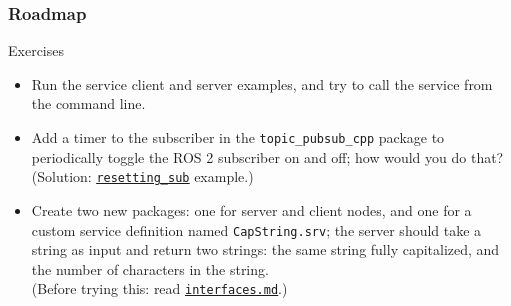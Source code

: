\documentclass[aspectratio=169]{beamer}
\begin{document}
\frame{\titlepage}



\begin{frame}
	\frametitle{Roadmap}
	\tableofcontents
\end{frame}







\begin{frame}{Exercises}
  \justifying
	\begin{itemize}
    \item Run the service client and server examples, and try to call the service from the command line.
		\item Add a timer to the subscriber in the \texttt{topic\_pubsub\_cpp} package to periodically toggle the ROS 2 subscriber on and off; how would you do that?\\
		      (Solution: \href{https://github.com/IntelligentSystemsLabUTV/ros2-examples/blob/jazzy/src/cpp/topic_pubsub_cpp/src/resetting_sub.cpp}{\color{blue}\underline{\texttt{resetting\_sub}}} example.)
		\item Create two new packages: one for server and client nodes, and one for a custom service definition named \texttt{CapString.srv}; the server should take a string as input and return two strings: the same string fully capitalized, and the number of characters in the string.\\
		      (Before trying this: read \href{https://github.com/IntelligentSystemsLabUTV/ros2-examples/blob/jazzy/interfaces.md}{\color{blue}\underline{\texttt{interfaces.md}}}.)
	\end{itemize}
\end{frame}
\end{document}
